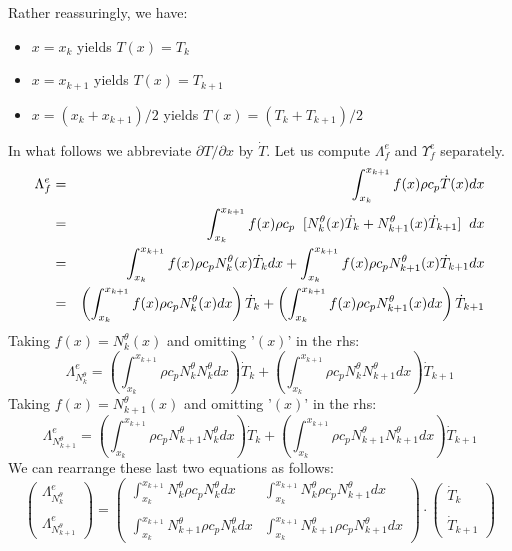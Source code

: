 Rather reassuringly, we have:
\begin{itemize}
\item $x=x_k$ yields $T(x)=T_k$
\item $x=x_{k+1}$ yields $T(x)=T_{k+1}$
\item $x=(x_k+x_{k+1})/2$ yields $T(x)=(T_k+T_{k+1})/2$
\end{itemize}
In what follows we abbreviate $\partial T/\partial x$ by $\dot{T}$.
Let us compute ${\Lambda}_f^e$ and ${\Upsilon}_f^e$ separately.
\begin{eqnarray}
{\Lambda}_f^e 
&=&\int_{x_k}^{x_{k+1}} f(x) \rho c_p \dot T(x) dx \nonumber\\
&=& \int_{x_k}^{x_{k+1}} f(x) \rho c_p \;\;  [ N_{k}^\theta(x) \dot{T}_k + N_{k+1}^\theta(x) \dot{T}_{k+1} ] \;\; dx  \nonumber\\
&=& \int_{x_k}^{x_{k+1}} f(x) \rho c_p N_{k}^\theta(x) \dot{T}_k  dx  
+ \int_{x_k}^{x_{k+1}} f(x) \rho c_p N_{k+1}^\theta(x) \dot{T}_{k+1}   dx \nonumber\\
&=&  \left( \int_{x_k}^{x_{k+1}} f(x) \rho c_p  N_{k}^\theta(x) dx \right) \dot{T}_k  
+ \left( \int_{x_k}^{x_{k+1}} f(x) \rho c_p N_{k+1}^\theta(x) dx \right)  \dot{T}_{k+1}  \nonumber
\end{eqnarray}
Taking $f(x)=N_k^\theta(x)$ and omitting '$(x)$' in the rhs:
\[
{\Lambda}_{N_k^\theta}^e=
\left( \int_{x_k}^{x_{k+1}} \rho c_p  N_k^\theta N_{k}^\theta dx \right) \dot{T}_k  
+ \left( \int_{x_k}^{x_{k+1}} \rho c_p N_k^\theta N_{k+1}^\theta dx \right)  \dot{T}_{k+1} 
\]
Taking $f(x)=N_{k+1}^\theta(x)$ and omitting '$(x)$' in the rhs:
\[
{\Lambda}_{N_{k+1}^\theta}^e
=  \left( \int_{x_k}^{x_{k+1}} \rho c_p N_{k+1}^\theta N_{k}^\theta dx \right) \dot{T}_k  
+ \left( \int_{x_k}^{x_{k+1}}  \rho c_p  N_{k+1}^\theta N_{k+1}^\theta dx \right)  \dot{T}_{k+1} 
\]
We can rearrange these last two equations as follows:
\[
\left(
\begin{array}{c}
{\Lambda}_{N_k^\theta}^e  \\ \\ {\Lambda}_{N_{k+1}^\theta}^e
\end{array}
\right)
=
\left(
\begin{array}{cc}
\int_{x_k}^{x_{k+1}} N_k^\theta     \rho c_p N_{k}^\theta dx  &  \int_{x_k}^{x_{k+1}} N_k^\theta  \rho c_p N_{k+1}^\theta dx \\ \\
\int_{x_k}^{x_{k+1}} N_{k+1}^\theta \rho c_p N_{k}^\theta dx  &  \int_{x_k}^{x_{k+1}} N_{k+1}^\theta \rho c_p N_{k+1}^\theta dx 
\end{array}
\right)
\cdot
\left(
\begin{array}{c}
\dot{T}_k \\ \\
\dot{T}_{k+1}
\end{array}
\right)
\]
